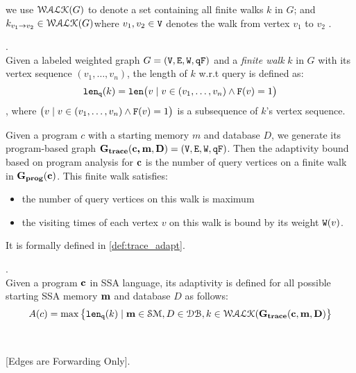 {{we use $\mathcal{WALK}(G)$ to denote a set containing all finite walks $k$ in $G$;
and $k_{v_1 \to v_2} \in \mathcal{WALK}(G)$where $v_1, v_2 \in \mathtt{V}$ denotes the walk from vertex $v_1$ to $v_2$ .
%
%
\begin{defn}.
\label{def:qlen}
\\
Given a labeled weighted graph $G = (\mathtt{V}, \mathtt{E}, \mathtt{W}, \mathtt{qF})$ and a \emph{finite walk} $k$ in $G$ with its vertex sequence $(v_1, \ldots, v_{n})$, the length of $k$ w.r.t query is defined as:
\[
  \mathtt{len}_{\tt q}(k) = \mathtt{len}\big(
  v \mid v \in (v_1, \ldots, v_{n}) \land \mathtt{F}(v) = 1 \big)
\]
, where $\big(v \mid v \in (v_1, \ldots, v_{n}) \land \mathtt{F}(v) = 1 \big)$ is a subsequence of $k$'s vertex sequence.
\end{defn}
%
Given a program $c$ with a starting memory $m$ and database $D$, we generate its program-based graph 
$\bf{G_{trace}}({\boldsymbol{\mathbf{c, m}}}, D) = (\mathtt{V}, \mathtt{E}, \mathtt{W}, \mathtt{qF})$.
%
Then the adaptivity bound based on program analysis for ${\boldsymbol{\mathbf{c}}}$ is the number of query vertices on a finite walk in $\mathtt{\bf{G_{prog}}}({\boldsymbol{\mathbf{c}}})$. This finite walk satisfies:
%
\begin{itemize}
\item the number of query vertices on this walk is maximum
\item the visiting times of each vertex $v$ on this walk is bound by its weight $\mathtt{W}(v)$.
\end{itemize}
%
It is formally defined in \ref{def:trace_adapt}.
%
\begin{defn}
.
\label{def:trace_adapt}
\\
Given a program ${\boldsymbol{\mathbf{c}}}$ in SSA language, 
its adaptivity is defined for all possible starting SSA memory ${\boldsymbol{\mathbf{m}}}$ and database $D$ as follows:
%
$$
A(c) = \max \big 
\{ \mathtt{len}_{\tt q}(k) \mid {\boldsymbol{\mathbf{m}}} \in \mathcal{SM},D \in \mathcal{DB} , k \in \mathcal{WALK}(\bf{G_{trace}}(c, m, D) \big \} 
$$
\end{defn}
}
\\
%
%
%
%
\begin{lem}
\label{lem:edgeforwarding}
[Edges are Forwarding Only].
\\

\end{lem}}
